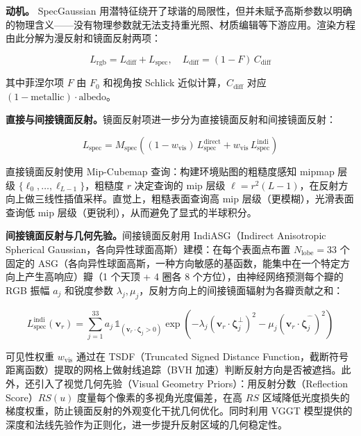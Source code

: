 \textbf{动机。} SpecGaussian 用潜特征绕开了球谐的局限性，但并未赋予高斯参数以明确的物理含义——没有物理参数就无法支持重光照、材质编辑等下游应用。渲染方程由此分解为漫反射和镜面反射两项：

\begin{equation}
L_{\text{rgb}} = L_{\text{diff}} + L_{\text{spec}}, \quad L_{\text{diff}} = (1 - F) \, C_{\text{diff}}
\end{equation}

其中菲涅尔项 $F$ 由 $F_0$ 和视角按 Schlick 近似计算，$C_{\text{diff}}$ 对应 $(1 - \text{metallic}) \cdot \text{albedo}$。

\textbf{直接与间接镜面反射。}镜面反射项进一步分为直接镜面反射和间接镜面反射：

\begin{equation}
L_{\text{spec}} = M_{\text{spec}} \!\left( (1 - w_{\text{vis}}) \, L_{\text{spec}}^{\text{direct}} + w_{\text{vis}} \, L_{\text{spec}}^{\text{indi}} \right)
\end{equation}

直接镜面反射使用 Mip-Cubemap 查询：构建环境贴图的粗糙度感知 mipmap 层级 $\{\ell_0, \ldots, \ell_{L-1}\}$，粗糙度 $r$ 决定查询的 mip 层级 $\ell = r^2 (L - 1)$，在反射方向上做三线性插值采样。直觉上，粗糙表面查询高 mip 层级（更模糊），光滑表面查询低 mip 层级（更锐利），从而避免了显式的半球积分。

\textbf{间接镜面反射与几何先验。}间接镜面反射用 IndiASG（Indirect Anisotropic Spherical Gaussian，各向异性球面高斯）建模：在每个表面点布置 $N_{\text{lobe}} = 33$ 个固定的 ASG（各向异性球面高斯，一种方向敏感的基函数，能集中在一个特定方向上产生高响应）瓣（1 个天顶 + 4 圈各 8 个方位），由神经网络预测每个瓣的 RGB 振幅 $a_j$ 和锐度参数 $\lambda_j, \mu_j$，反射方向上的间接镜面辐射为各瓣贡献之和：

\begin{equation}
L_{\text{spec}}^{\text{indi}}(\mathbf{v}_r) = \sum_{j=1}^{33} a_j \, \mathbb{1}_{(\mathbf{v}_r \cdot \boldsymbol{\zeta}_j > 0)} \exp\!\left(-\lambda_j (\mathbf{v}_r \cdot \boldsymbol{\zeta}_j^\perp)^2 - \mu_j (\mathbf{v}_r \cdot \boldsymbol{\zeta}_j^{\hat{\phantom{\perp}}})^2\right)
\end{equation}

可见性权重 $w_{\text{vis}}$ 通过在 TSDF（Truncated Signed Distance Function，截断符号距离函数）提取的网格上做射线追踪（BVH 加速）判断反射方向是否被遮挡。此外，还引入了视觉几何先验（Visual Geometry Priors）：用反射分数（Reflection Score）$RS(u)$ 度量每个像素的多视角光度偏差，在高 $RS$ 区域降低光度损失的梯度权重，防止镜面反射的外观变化干扰几何优化。同时利用 VGGT 模型提供的深度和法线先验作为正则化，进一步提升反射区域的几何稳定性。

